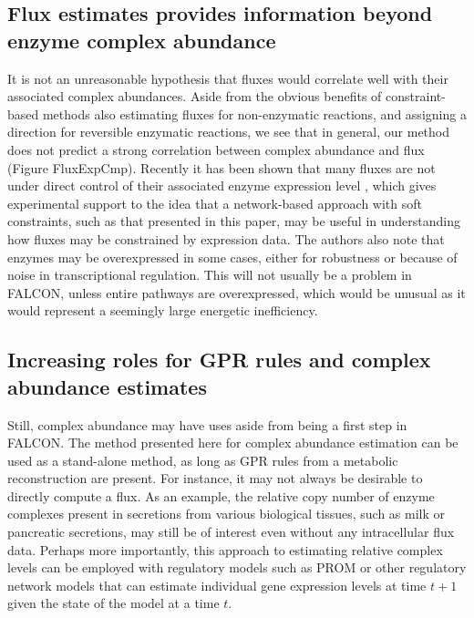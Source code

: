 \subsection{Flux estimates provides information beyond enzyme complex abundance}
It is not an unreasonable hypothesis that fluxes would correlate well
with their associated complex abundances. Aside from the obvious benefits
of constraint-based methods also estimating fluxes for non-enzymatic
reactions, and assigning a direction for reversible enzymatic
reactions, we see that in general, our method does not predict a
strong correlation between complex abundance and flux
(Figure FluxExpCmp). Recently it has been shown that many fluxes are not
under direct control of their associated enzyme expression
level \citep{Chubukov2013}, which gives experimental support to the
idea that a network-based approach with soft constraints, such as that
presented in this paper, may be useful in understanding how fluxes may
be constrained by expression data. The authors also note that enzymes
may be overexpressed in some cases, either for robustness or because
of noise in transcriptional regulation. This will not usually be a
problem in FALCON, unless entire pathways are overexpressed, which
would be unusual as it would represent a seemingly large energetic
inefficiency.

\subsection{Increasing roles for GPR rules and complex abundance estimates}
Still, complex abundance may have uses aside from being a first
step in FALCON. The method presented here for complex abundance
estimation can be used as a stand-alone method, as long as GPR
rules from a metabolic reconstruction are present. For instance, it
may not always be desirable to directly compute a flux. As an example,
the relative copy number of enzyme complexes present in secretions
from various biological tissues, such as milk or pancreatic
secretions, may still be of interest even without any intracellular
flux data.  Perhaps more importantly, this approach to estimating
relative complex levels can be employed with regulatory models such as
PROM \citep{Chandrasekaran2010a} or other regulatory network models
that can estimate individual gene expression levels at time $t+1$
given the state of the model at a time $t$.

